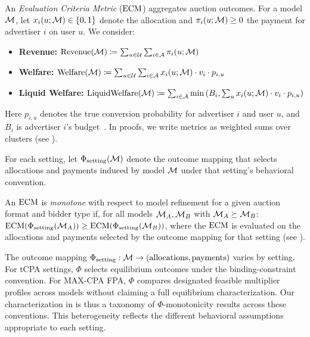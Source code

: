 \begin{definition}
\label{def:ecm}
An \emph{Evaluation Criteria Metric} ($\text{ECM}$) aggregates auction outcomes. For a model $\mathcal{M}$, let $x_i(u; \mathcal{M}) \in \{0, 1\}$ denote the allocation and $\pi_i(u; \mathcal{M}) \geq 0$ the payment for advertiser $i$ on user $u$. We consider:
\begin{itemize}
    \item \textbf{Revenue:} $\mathrm{Revenue}(\mathcal{M}) \coloneqq \sum_{u \in \mathcal{U}} \sum_{i \in \mathcal{A}} \pi_i(u; \mathcal{M})$
    \item \textbf{Welfare:} $\mathrm{Welfare}(\mathcal{M}) \coloneqq \sum_{u \in \mathcal{U}} \sum_{i \in \mathcal{A}} x_i(u; \mathcal{M}) \cdot v_i \cdot p_{i,u}$
    \item \textbf{Liquid Welfare:} $\mathrm{LiquidWelfare}(\mathcal{M}) \coloneqq \sum_{i \in \mathcal{A}} \min\left( B_i, \sum_{u} x_i(u; \mathcal{M}) \cdot v_i \cdot p_{i,u} \right)$
\end{itemize}
Here $p_{i,u}$ denotes the true conversion probability for advertiser $i$ and user $u$, and $B_i$ is advertiser $i$'s budget~\citep{dobzinski2014liquidwelfare}. In proofs, we write metrics as weighted sums over clusters (see ).
\end{definition}

For each setting, let $\Phi_{\text{setting}}(\mathcal{M})$ denote the outcome mapping that selects allocations and payments induced by model $\mathcal{M}$ under that setting's behavioral convention.

\begin{definition}
\label{def:ecm_monotonicity}
An $\text{ECM}$ is \emph{monotone} with respect to model refinement for a given auction format and bidder type if, for all models $\mathcal{M}_A, \mathcal{M}_B$ with $\mathcal{M}_A \succeq \mathcal{M}_B$:
$\text{ECM}(\Phi_{\text{setting}}(\mathcal{M}_A)) \geq \text{ECM}(\Phi_{\text{setting}}(\mathcal{M}_B))$,
where the $\text{ECM}$ is evaluated on the allocations and payments selected by the outcome mapping for that setting (see ).
\end{definition}

\begin{remark}
\label{rem:outcome-mapping}
The outcome mapping $\Phi_{\text{setting}}: \mathcal{M} \to (\text{allocations}, \text{payments})$ varies by setting. For tCPA settings, $\Phi$ selects equilibrium outcomes under the binding-constraint convention. For MAX-CPA FPA, $\Phi$ compares designated feasible multiplier profiles across models without claiming a full equilibrium characterization. Our characterization in  is thus a taxonomy of $\Phi$-monotonicity results across these conventions. This heterogeneity reflects the different behavioral assumptions appropriate to each setting.
\end{remark}

